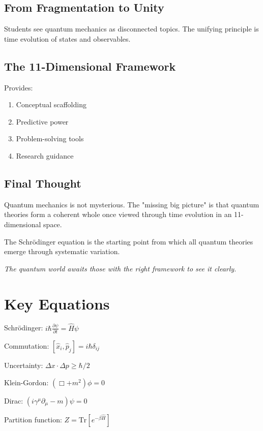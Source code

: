 \documentclass[12pt]{book}
\begin{document}
\section{From Fragmentation to Unity}

Students see quantum mechanics as disconnected topics. The unifying principle is time evolution of states and observables.

\section{The 11-Dimensional Framework}

Provides:
\begin{enumerate}
  \item Conceptual scaffolding
  \item Predictive power
  \item Problem-solving tools
  \item Research guidance
\end{enumerate}

\section{Final Thought}

Quantum mechanics is not mysterious. The "missing big picture" is that quantum theories form a coherent whole once viewed through time evolution in an 11-dimensional space.

The Schrödinger equation is the starting point from which all quantum theories emerge through systematic variation.

\vspace{2cm}
\textit{The quantum world awaits those with the right framework to see it clearly.}

\appendix

\chapter{Key Equations}

Schrödinger: $i\hbar\frac{\partial\psi}{\partial t} = \hat{H}\psi$

Commutation: $[\hat{x}_i, \hat{p}_j] = i\hbar\delta_{ij}$

Uncertainty: $\Delta x \cdot \Delta p \geq \hbar/2$

Klein-Gordon: $(\Box + m^2)\phi = 0$

Dirac: $(i\gamma^\mu\partial_\mu - m)\psi = 0$

Partition function: $Z = \text{Tr}[e^{-\beta\hat{H}}]$
\end{document}
